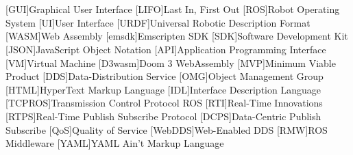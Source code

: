 \chapter*{}



\section*{}
\begin{acronym}[LONGEST]

    [GUI]{Graphical User Interface}
    [LIFO]{Last In, First Out}
    [ROS]{Robot Operating System}
    [UI]{User Interface}
    [URDF]{Universal Robotic Description Format}
    [WASM]{Web Assembly}
    [emsdk]{Emscripten SDK}
    [SDK]{Software Development Kit}
    [JSON]{JavaScript Object Notation}
    [API]{Application Programming Interface}
    [VM]{Virtual Machine}
    [D3wasm]{Doom 3 WebAssembly}
    [MVP]{Minimum Viable Product}
    [DDS]{Data-Distribution Service}
    [OMG]{Object Management Group}
    [HTML]{HyperText Markup Language}
    [IDL]{Interface Description Language}
    [TCPROS]{Transmission Control Protocol ROS}
    [RTI]{Real-Time Innovations}
    [RTPS]{Real-Time Publish Subscribe Protocol}
    [DCPS]{Data-Centric Publish Subscribe}
    [QoS]{Quality of Service}
    [WebDDS]{Web-Enabled DDS}
    [RMW]{ROS Middleware}
    [YAML]{YAML Ain't Markup Language}

\end{acronym}








